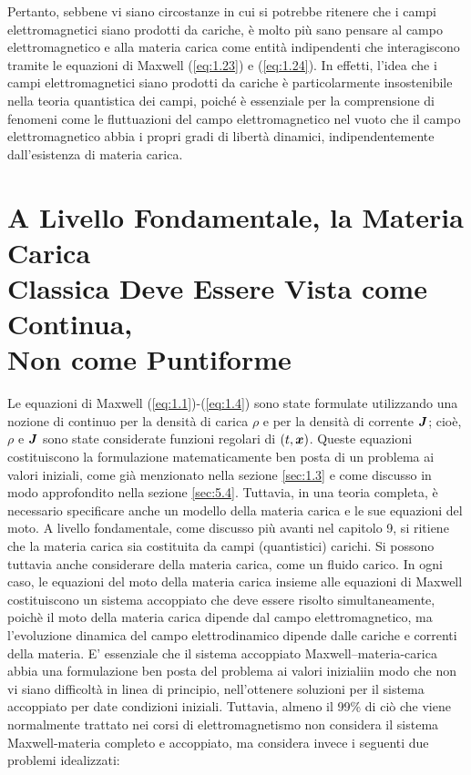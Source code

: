 Pertanto, sebbene vi siano circostanze in cui si potrebbe ritenere che i campi elettromagnetici siano prodotti da cariche, è molto più sano pensare al campo elettromagnetico e alla materia carica come entità indipendenti che interagiscono tramite le equazioni di Maxwell (\ref{eq:1.23}) e (\ref{eq:1.24}). In effetti, l'idea che i campi elettromagnetici siano prodotti da cariche è particolarmente insostenibile nella teoria quantistica dei campi, poiché è essenziale per la comprensione di fenomeni come le fluttuazioni del campo elettromagnetico nel vuoto che il campo elettromagnetico abbia i propri gradi di libertà dinamici, indipendentemente dall'esistenza di materia carica.

\section[Materia Carica come un Continuo]{A Livello Fondamentale, la Materia Carica \\Classica Deve Essere Vista come Continua, \\Non come Puntiforme}\label{sec:1.4}

Le equazioni di Maxwell (\ref{eq:1.1})-(\ref{eq:1.4}) sono state formulate utilizzando una nozione di continuo per la densità di carica $\rho$ e per la densità di corrente $\vb*{J}$; cioè, $\rho$ e  $\vb*{J}$ sono state considerate funzioni regolari di $(t, \vb*{x})$. Queste equazioni costituiscono la formulazione matematicamente ben posta di un problema ai valori iniziali, come già menzionato nella sezione \ref{sec:1.3} e come discusso in modo approfondito nella sezione \ref{sec:5.4}. Tuttavia, in una teoria completa, è necessario specificare anche un modello della materia carica e le sue equazioni del moto. A livello fondamentale, come discusso più avanti nel capitolo 9, si ritiene che la materia carica sia costituita da campi (quantistici) carichi.  Si possono tuttavia anche considerare  della materia carica, come un fluido carico. In ogni caso, le equazioni del moto della materia carica insieme alle equazioni di Maxwell costituiscono un sistema accoppiato che deve essere risolto simultaneamente, poichè il moto della materia carica dipende dal campo elettromagnetico, ma l'evoluzione dinamica del campo elettrodinamico dipende dalle cariche e correnti della materia. E' essenziale che il sistema accoppiato Maxwell--materia-carica abbia una formulazione ben posta del problema ai valori inizialiin modo che non vi siano difficoltà in linea di principio, nell'ottenere soluzioni per il sistema accoppiato per date condizioni iniziali. Tuttavia, almeno il 99\% di ciò che viene normalmente trattato nei corsi di elettromagnetismo non considera il sistema Maxwell-materia completo e accoppiato, ma considera invece i seguenti due problemi idealizzati:

